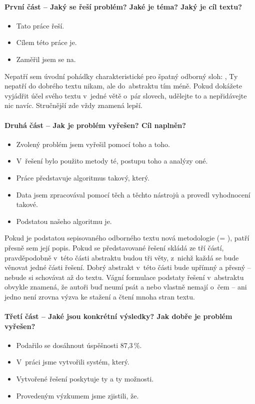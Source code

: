 \paragraph{První část -- Jaký se řeší problém? Jaké je téma? Jaký je cíl textu?}
\begin{itemize}
  \item{Tato práce řeší.}
  \item{Cílem této práce je.}
  \item{Zaměřil jsem se na.}
\end{itemize}
Nepatří sem úvodní pohádky charakteristické pro špatný odborný sloh: ,  Ty nepatří do dobrého textu nikam, ale do~abstraktu tím méně. Pokud dokážete vyjádřit účel svého textu v~jedné větě o~pár slovech, udělejte to a nepřidávejte nic navíc. Stručnější zde vždy znamená lepší.

\paragraph{Druhá část -- Jak je problém vyřešen? Cíl naplněn?}
\begin{itemize}
  \item{Zvolený problém jsem vyřešil pomocí toho a toho.}
  \item{V~řešení bylo použito metody té, postupu toho a analýzy oné.}
  \item{Práce představuje algoritmus takový, který.}
  \item{Data jsem zpracovával pomocí těch a těchto nástrojů a provedl vyhodnocení takové.}
  \item{Podstatou našeho algoritmu je.}
\end{itemize}

Pokud je podstatou sepisovaného odborného textu nová metodologie (= ), patří přesně sem její popis. Pokud se představované řešení skládá ze tří částí, pravděpodobně v~této části abstraktu budou tři věty, z~nichž každá se bude věnovat jedné části řešení. Dobrý abstrakt v~této části bude upřímný a přesný -- nebude si schovávat  až do textu. Vágní formulace podstaty řešení v~abstraktu obvykle znamená, že autoři buď neumí psát a nebo vlastně nemají o~čem -- ani jedno není zrovna výzva ke stažení a čtení mnoha stran textu.

\paragraph{Třetí část -- Jaké jsou konkrétní výsledky? Jak dobře je problém vyřešen?}
\begin{itemize}
  \item{Podařilo se dosáhnout úspěšnosti 87,3\,\%.}
  \item{V~práci jsme vytvořili systém, který.}
  \item{Vytvořené řešení poskytuje ty a ty možnosti.}
  \item{Provedeným výzkumem jsme zjistili, že.}
\end{itemize}

